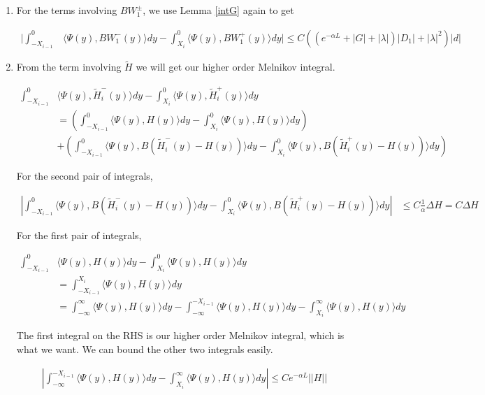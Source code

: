 \documentclass[12pt]{article}
\begin{document}
\begin{enumerate}
\item For the terms involving $B W_1^\pm$, we use Lemma \ref{intG} again to get

\begin{align*}
\Big| \int_{-X_{i-1}}^0 &\langle \Psi(y), B W_1^-(y) \rangle dy - \int_{X_i}^0 \langle \Psi(y), B W_1^+(y) \rangle dy \Big| \leq C \left( \left(e^{-\alpha L} + |G| + |\lambda|  \right) |D_1| + |\lambda|^2  \right)|d|
\end{align*}

\item From the term involving $\tilde{H}$ we will get our higher order Melnikov integral.

\begin{align*}
\int_{-X_{i-1}}^0 &\langle \Psi(y), \tilde{H}_i^-(y) \rangle dy - \int_{X_i}^0 \langle \Psi(y), \tilde{H}_i^+(y) \rangle dy \\
&= \left( \int_{-X_{i-1}}^0 \langle \Psi(y), H(y) \rangle dy - \int_{X_i}^0 \langle \Psi(y), H(y) \rangle dy \right) \\
&+ \left( \int_{-X_{i-1}}^0 \langle \Psi(y), B (\tilde{H}_i^-(y) - H(y)) \rangle dy - \int_{X_i}^0 \langle \Psi(y), B (\tilde{H}_i^+(y) - H(y)) \rangle dy \right) 
\end{align*}

For the second pair of integrals,

\begin{align*}
\left| \int_{-X_{i-1}}^0 \langle \Psi(y), B (\tilde{H}_i^-(y) - H(y)) \rangle dy - \int_{X_i}^0 \langle \Psi(y), B (\tilde{H}_i^+(y) - H(y)) \rangle dy \right| &\leq C \frac{1}{\alpha} \Delta H = C \Delta H
\end{align*}

For the first pair of integrals,

\begin{align*}
\int_{-X_{i-1}}^0 &\langle \Psi(y), H(y) \rangle dy - \int_{X_i}^0 \langle \Psi(y), H(y) \rangle dy \\
&= \int_{-X_{i-1}}^{X_i} \langle \Psi(y), H(y) \rangle dy \\
&= \int_{-\infty}^{\infty} \langle \Psi(y), H(y) \rangle dy - \int_{-\infty}^{-X_{i-1}} \langle \Psi(y), H(y) \rangle dy - \int_{X_i}^{\infty} \langle \Psi(y), H(y) \rangle dy 
\end{align*}

The first integral on the RHS is our higher order Melnikov integral, which is what we want. We can bound the other two integrals easily.

\begin{align*}
\left| \int_{-\infty}^{-X_{i-1}} \langle \Psi(y), H(y) \rangle dy - \int_{X_i}^{\infty} \langle \Psi(y), H(y) \rangle dy \right| \leq C e^{-\alpha L}||H||
\end{align*}


\end{enumerate}
\end{document}

